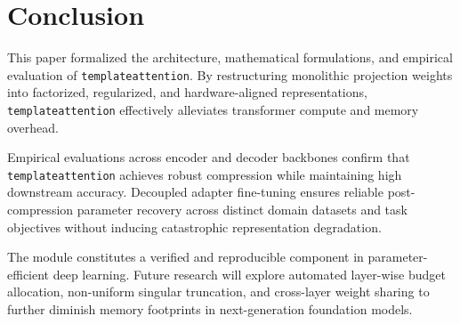 \section{Conclusion}
This paper formalized the architecture, mathematical formulations, and empirical evaluation of \texttt{templateattention}. By restructuring monolithic projection weights into factorized, regularized, and hardware-aligned representations, \texttt{templateattention} effectively alleviates transformer compute and memory overhead.

Empirical evaluations across encoder and decoder backbones confirm that \texttt{templateattention} achieves robust compression while maintaining high downstream accuracy. Decoupled adapter fine-tuning ensures reliable post-compression parameter recovery across distinct domain datasets and task objectives without inducing catastrophic representation degradation.

The module constitutes a verified and reproducible component in parameter-efficient deep learning. Future research will explore automated layer-wise budget allocation, non-uniform singular truncation, and cross-layer weight sharing to further diminish memory footprints in next-generation foundation models.
